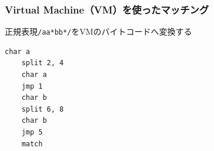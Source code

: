 \documentclass[12pt, unicode, svgnames]{beamer}
\begin{document}
\begin{frame}[fragile]
  \frametitle{Virtual Machine（VM）を使ったマッチング}

  正規表現\lstinline|/aa*bb*/|をVMのバイトコードへ変換する
  
  \begin{exampleblock}{}
    \begin{center}
\begin{lstlisting}[style=vm]
    char a
    split 2, 4
    char a
    jmp 1
    char b
    split 6, 8
    char b
    jmp 5
    match
\end{lstlisting}
    \end{center}
  \end{exampleblock}
\end{frame}
\end{document}
